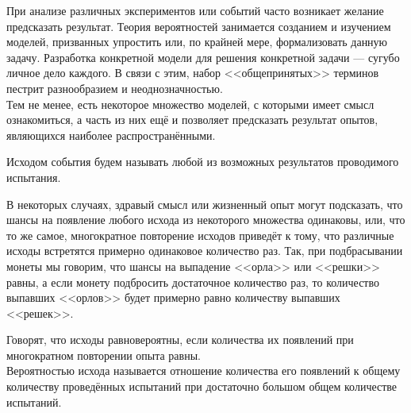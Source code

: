 \documentclass[a4paper,12pt]{article}
\begin{document}

При анализе различных экспериментов или событий часто возникает желание предсказать результат. 
Теория вероятностей занимается созданием и изучением моделей, призванных упростить или, по крайней мере, формализовать данную задачу.
Разработка конкретной модели для решения конкретной задачи --- сугубо личное дело каждого. 
В связи с этим, набор <<общепринятых>> терминов пестрит разнообразием и неоднозначностью.\\
Тем не менее, есть некоторое множество моделей, с которыми имеет смысл ознакомиться,
а часть из них ещё и позволяет предсказать результат опытов, являющихся наиболее распространёнными.


     Исходом события будем называть  любой из возможных результатов проводимого испытания.


В некоторых случаях, здравый смысл или жизненный опыт могут подсказать, что шансы на появление любого исхода из некоторого множества одинаковы, или, что то же самое, многократное повторение исходов приведёт к тому, что различные исходы встретятся примерно одинаковое количество раз. 
Так, при подбрасывании монеты мы говорим, что шансы на выпадение <<орла>> или <<решки>> равны, а если монету подбросить достаточное количество раз, то количество выпавших <<орлов>> будет примерно равно количеству выпавших <<решек>>.

  Говорят, что исходы  равновероятны, если количества их появлений при многократном повторении опыта равны.\\
   Вероятностью исхода называется отношение количества его появлений к общему количеству проведённых испытаний при достаточно большом общем количестве испытаний.
\end{document}
